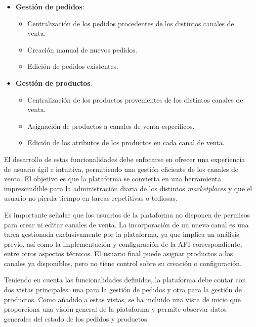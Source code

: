 \begin{itemize}
    \item \textbf{Gestión de pedidos}:
          \begin{itemize}
              \item Centralización de los pedidos procedentes de los distintos canales de venta.
              \item Creación manual de nuevos pedidos.
              \item Edición de pedidos existentes.
          \end{itemize}
    \item \textbf{Gestión de productos}:
          \begin{itemize}
              \item Centralización de los productos provenientes de los distintos canales de venta.
              \item Asignación de productos a canales de venta específicos.
              \item Edición de los atributos de los productos en cada canal de venta.
          \end{itemize}
\end{itemize}

El desarrollo de estas funcionalidades debe enfocarse en ofrecer una experiencia de usuario ágil e intuitiva, permitiendo una gestión eficiente de los canales de venta. El objetivo es que la plataforma se convierta en una herramienta imprescindible para la administración diaria de los distintos \textit{marketplaces} y que el usuario no pierda tiempo en tareas repetitivas o tediosas.

Es importante señalar que los usuarios de la plataforma no disponen de permisos para crear ni editar canales de venta. La incorporación de un nuevo canal es una tarea gestionada exclusivamente por la plataforma, ya que implica un análisis previo, así como la implementación y configuración de la API correspondiente, entre otros aspectos técnicos. El usuario final puede asignar productos a los canales ya disponibles, pero no tiene control sobre su creación o configuración.

Teniendo en cuenta las funcionalidades definidas, la plataforma debe contar con dos vistas principales: una para la gestión de pedidos y otra para la gestión de productos. Como añadido a estas vistas, se ha incluido una vista de inicio que proporciona una visión general de la plataforma y permite observar datos generales del estado de los pedidos y productos.

